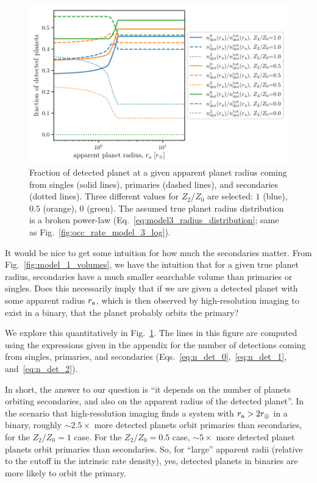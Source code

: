 \documentclass[12pt,modern]{aastex61}
\renewcommand{\a}{_{\rm a}}
\begin{document}
\begin{figure}[!t]
    \centering
    \includegraphics[width=\textwidth]{figures/ndet_vs_radius_logx_model_3_fraclines_rpu_22.5_manyZs.pdf}
    \caption{
        Fraction of detected planet at a given apparent planet radius coming 
        from singles (solid lines), primaries (dashed lines), and secondaries 
        (dotted lines).
        Three different values for $Z_2/Z_0$ are selected: $1$ (blue), $0.5$ 
        (orange), $0$ (green).
        The assumed true planet radius distribution is a broken power-law
        (Eq.~\ref{eq:model3_radius_distribution}; same as 
        Fig.~\ref{fig:occ_rate_model_3_log}).
    }
    \label{fig:frac_model_3}
\end{figure}

It would be nice to get some intuition for how much the secondaries matter.
From Fig.~\ref{fig:model_1_volumes}, we have the intuition that for a given 
true planet radius, secondaries have a much smaller searchable volume than 
primaries or singles.
Does this necessarily imply that if we are given a detected planet with some 
apparent radius $r\a$, which is then observed by high-resolution imaging to 
exist in a binary, that the planet probably orbits the primary?

We explore this quantitatively in Fig.~\ref{fig:frac_model_3}.
The lines in this figure are computed using the expressions given in the 
appendix for the number of detections coming from singles, primaries, and 
secondaries (Eqs.~\ref{eq:n_det_0},~\ref{eq:n_det_1}, and~\ref{eq:n_det_2}).

In short, the answer to our question is ``it depends on the number of planets 
orbiting secondaries, and also on the apparent radius of the detected planet''.
In the scenario that high-resolution imaging finds a system with $r\a > 
2r_\oplus$ in a binary, roughly $\sim 2.5\times$ more detected planets orbit 
primaries than secondaries, for the $Z_2/Z_0=1$ case.
For the $Z_2/Z_0=0.5$ case, $\sim 5\times$ more detected planet 
planets orbit primaries than secondaries.
So, for ``large'' apparent radii (relative to the cutoff in the 
intrinsic rate density), yes, detected planets in binaries are more 
likely to orbit the primary.
\end{document}
